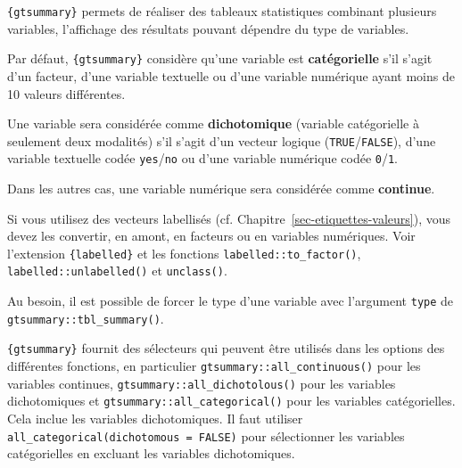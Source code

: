 \documentclass[
  letterpaper,
  DIV=11,
  numbers=noendperiod,
  oneside]{scrreprt}
\begin{document}
\begin{tcolorbox}[enhanced jigsaw, colbacktitle=quarto-callout-important-color!10!white, opacityback=0, toprule=.15mm, colback=white, coltitle=black, bottomtitle=1mm, toptitle=1mm, titlerule=0mm, rightrule=.15mm, title=\textcolor{quarto-callout-important-color}{\faExclamation}\hspace{0.5em}{Remarque sur les types de variables et les sélecteurs associés}, breakable, bottomrule=.15mm, opacitybacktitle=0.6, arc=.35mm, left=2mm, leftrule=.75mm, colframe=quarto-callout-important-color-frame]

\texttt{\{gtsummary\}} permets de réaliser des tableaux statistiques
combinant plusieurs variables, l'affichage des résultats pouvant
dépendre du type de variables.

Par défaut, \texttt{\{gtsummary\}} considère qu'une variable est
\textbf{catégorielle} s'il s'agit d'un facteur, d'une variable textuelle
ou d'une variable numérique ayant moins de 10 valeurs différentes.

Une variable sera considérée comme \textbf{dichotomique} (variable
catégorielle à seulement deux modalités) s'il s'agit d'un vecteur
logique (\texttt{TRUE}/\texttt{FALSE}), d'une variable textuelle codée
\texttt{yes}/\texttt{no} ou d'une variable numérique codée
\texttt{0}/\texttt{1}.

Dans les autres cas, une variable numérique sera considérée comme
\textbf{continue}.

Si vous utilisez des vecteurs labellisés (cf.
Chapitre~\ref{sec-etiquettes-valeurs}), vous devez les convertir, en
amont, en facteurs ou en variables numériques. Voir l'extension
\texttt{\{labelled\}} et les fonctions \texttt{labelled::to\_factor()},
\texttt{labelled::unlabelled()} et \texttt{unclass()}.

Au besoin, il est possible de forcer le type d'une variable avec
l'argument \texttt{type} de \texttt{gtsummary::tbl\_summary()}.

\texttt{\{gtsummary\}} fournit des sélecteurs qui peuvent être utilisés
dans les options des différentes fonctions, en particulier
\texttt{gtsummary::all\_continuous()} pour les variables continues,
\texttt{gtsummary::all\_dichotolous()} pour les variables dichotomiques
et \texttt{gtsummary::all\_categorical()} pour les variables
catégorielles. Cela inclue les variables dichotomiques. Il faut utiliser
\texttt{all\_categorical(dichotomous\ =\ FALSE)} pour sélectionner les
variables catégorielles en excluant les variables dichotomiques.

\end{tcolorbox}
\end{document}
